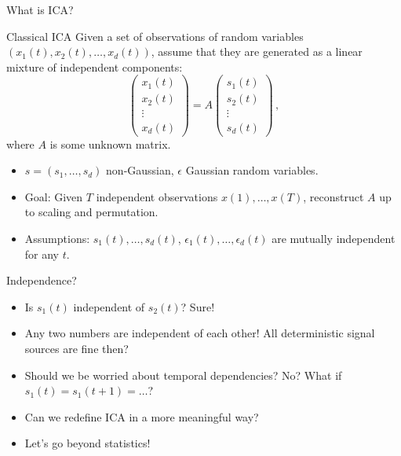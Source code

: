 \documentclass[final]{beamer} %
\newcommand{\eps}{\epsilon}
\begin{document}
\begin{frame}[c]
\begin{columns}[t,totalwidth=\textwidth]
\begin{column}{.32\textwidth}
\begin{block}{What is ICA?}
\begin{figure}
			\end{figure}
			\vspace{-0.5cm} 					
		\end{block}
		\vspace{0.5ex}

	
		\begin{block}{Classical ICA}
		Given a set of observations of random variables
		$(x_1(t),x_2(t),\dots,x_d(t))$, 
		assume that they are generated as a linear mixture of \alert{independent components}:
		\[
		\begin{pmatrix}
		x_1(t)\\x_2(t)\\ \vdots \\ x_d(t)
		\end{pmatrix} = A
		\begin{pmatrix}
		s_1(t)\\s_2(t)\\ \vdots \\ s_d(t)
		\end{pmatrix}\,,
		\]
		where $A$ is some unknown matrix.
			\begin{itemize}
				\item $s = (s_1,\ldots, s_d)$ non-Gaussian, $\eps$ Gaussian random variables.
				\item Goal: Given $T$ independent observations $x(1), \ldots, x(T)$, reconstruct $A$ up to scaling and permutation.
				\item Assumptions:
                $s_1(t),\ldots, s_d(t)$, $\eps_1(t), \ldots, \eps_d(t)$ are mutually independent for any $t$.		
			\end{itemize}
		\end{block}
		\vspace{0.5ex}
		\begin{block}{Independence?}
			\begin{itemize}
			\item Is $s_1(t)$ independent of $s_2(t)$? Sure!
			\item Any two numbers are independent of each other! 
			\alert{All deterministic signal sources are fine then?}
			\item Should we be worried about temporal dependencies? No? \alert{What if $s_1(t) = s_1(t+1) = \dots$?} 
			\item Can we redefine ICA in a more meaningful way?
			\item \alert{Let's go beyond statistics!}
			\end{itemize}

\end{block}
\end{column}
\end{columns}
\end{frame}
\end{document}
